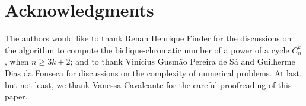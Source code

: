 \documentclass{article}
\begin{document}
\section*{Acknowledgments}
The authors would like to thank Renan Henrique Finder for the discussions on
the algorithm to compute the biclique-chromatic number of a power of a cycle
$C_n^k$, when $n \geq 3k + 2$; and to thank Vin{\'i}cius Gusm{\~a}o Pereira de
S{\'a} and Guilherme Dias da Fonseca for discussions on the complexity of
numerical problems. At last, but not least, we thank Vanessa Cavalcante for
the careful proofreading of this paper.





\end{document}
